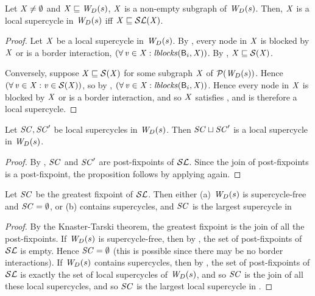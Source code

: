 \begin{proposition} \label{prop:locGFP} \label{prop:supercycleGFPLoc}
Let $\XS \ne \ewfg$ and $\XS \subg \lwfg{B}{s}{\DS}$, \ie $\XS$ is a non-empty subgraph of $\lwfg{B}{s}{\DS}$.
Then, $\XS$ is a local supercycle in $\lwfg{B}{s}{\DS}$ iff $\XS \subg \lSF{\XS}$.
\end{proposition}
%
\begin{proof}
Let $\XS$ be a local supercycle in $\lwfg{B}{s}{\DS}$. By , every node in $\XS$ is blocked by $\XS$ or is a border interaction, \ie 
$(\fa \ndv \in \XS: \lblocks{\B_i}{\XS})$. By , $\XS \subg \SF{\XS}$.

Conversely, suppose $\XS \subg \SF{\XS}$ for some subgraph $\XS$ of $\lwfgS{B}{s}{\DS}$. Hence 
$(\fa \ndv \in \XS: \ndv \in \SF{\XS})$, so by , $(\fa \ndv \in \XS: \lblocks{\B_i}{\XS})$.
Hence every node in $\XS$ is blocked by $\XS$ or is a border interaction, and so $\XS$ satisfies , and is therefore a local supercycle.
\end{proof}

%
\begin{proposition} \label{prop:supercycleLoc:union}
Let $\SC, \SC'$ be local supercycles in $\lwfg{B}{s}{\DS}$. Then $\SC \join \SC'$ is
a local supercycle in $\lwfg{B}{s}{\DS}$.
\end{proposition}
%
\begin{proof}
By , $\SC$ and $\SC'$ are post-fixpoints of $\lSFs$. Since the join of post-fixpoints is a post-fixpoint, 
the proposition follows by applying  again.
\end{proof}


\begin{proposition} \label{prop:GFPisLargestSCLoc}
Let $\SC$ be the greatest fixpoint of $\lSFs$. Then either
(a) $\lwfg{B}{s}{\DS}$  is supercycle-free and $\SC = \ewfg$, or 
(b)  contains supercycles, and $\SC$ is the largest supercycle in 
\end{proposition}
%
\begin{proof}
By the Knaster-Tarski theorem, the greatest fixpoint is the join of all the post-fixpoints. 
If $\lwfg{B}{s}{\DS}$ is supercycle-free, then by , the set of post-fixpoints of $\lSFs$ is empty. 
Hence $\SC = \ewfg$ (this is possible since there may be no border interactions). %
If $\lwfg{B}{s}{\DS}$ contains supercycles, then by ,  the set of post-fixpoints of $\lSFs$ is exactly the set of 
local supercycles of $\lwfg{B}{s}{\DS}$, and so $\SC$ is the join of all these local supercycles, and so $\SC$ is the largest local supercycle in .
\end{proof}



